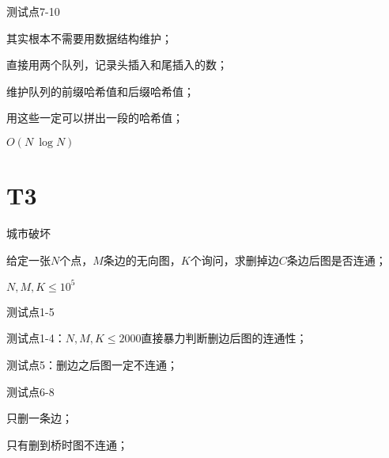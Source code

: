 \documentclass{beamer}
\begin{document}
\begin{frame}{测试点7-10}

	\par 其实根本不需要用数据结构维护；

	\pause

	\par 直接用两个队列，记录头插入和尾插入的数；

	\pause

	\par 维护队列的前缀哈希值和后缀哈希值；

	\par 用这些一定可以拼出一段的哈希值；

	\pause

	\par $O(N\ \log N)$

\end{frame}

\section{T3}
\begin{frame}{城市破坏}

	\par 给定一张$N$个点，$M$条边的无向图，$K$个询问，求删掉边$C$条边后图是否连通；

	\par $N,M,K \leq 10^5$

\end{frame}

\begin{frame}{测试点1-5}

	\par 测试点1-4：$N,M,K \leq 2000$直接暴力判断删边后图的连通性；

	\pause

	\par 测试点5：删边之后图一定不连通；

\end{frame}

\begin{frame}{测试点6-8}

	\par 只删一条边；

	\pause

	\par 只有删到桥时图不连通；

\end{frame}
\end{document}
